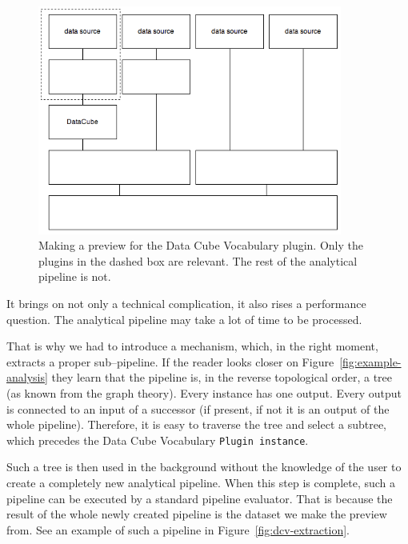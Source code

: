 \begin{figure}
	\centering
	\includegraphics[width=100mm]{img/dcv-preview-useful.png}
	\caption{Making a preview for the Data Cube Vocabulary plugin. Only the plugins in
	the dashed box are relevant. The rest of the analytical pipeline is not.}
	\label{fig:dcv-preview-useful}
\end{figure}

It brings on not only a technical complication, it also rises a performance 
question. The analytical pipeline may take a lot of time to be processed.

That is why we had to introduce a mechanism, which, in the right moment, 
extracts a proper sub--pipeline. If the reader looks closer on 
Figure~\ref{fig:example-analysis} they learn that the pipeline is,
in the reverse topological order, 
a tree (as known from the graph theory). Every instance has 
one output. Every output is connected to an input of a successor (if present, if not it is an output
of the whole pipeline). Therefore, it is easy to traverse the tree and select a 
subtree, which precedes the Data Cube Vocabulary \texttt{Plugin instance}.

Such a tree is then used in the background without the knowledge of the user to 
create a completely new analytical pipeline. When this step is complete, such a pipeline can 
be executed by a standard pipeline evaluator. That is because the result of the whole 
newly created pipeline is the dataset we make the preview from.
See an example of such a pipeline in Figure~\ref{fig:dcv-extraction}.

